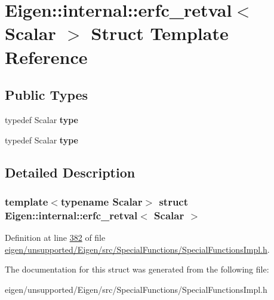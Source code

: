 \hypertarget{struct_eigen_1_1internal_1_1erfc__retval}{}\section{Eigen\+:\+:internal\+:\+:erfc\+\_\+retval$<$ Scalar $>$ Struct Template Reference}
\label{struct_eigen_1_1internal_1_1erfc__retval}
\subsection*{Public Types}
\begin{DoxyCompactItemize}
\item 
\mbox{\label{struct_eigen_1_1internal_1_1erfc__retval_a6b4c74ed95407afcec533882833e4356}} 
typedef Scalar {\bfseries type}
\item 
\mbox{\label{struct_eigen_1_1internal_1_1erfc__retval_a6b4c74ed95407afcec533882833e4356}} 
typedef Scalar {\bfseries type}
\end{DoxyCompactItemize}


\subsection{Detailed Description}
\subsubsection*{template$<$typename Scalar$>$\newline
struct Eigen\+::internal\+::erfc\+\_\+retval$<$ Scalar $>$}



Definition at line \hyperlink{eigen_2unsupported_2_eigen_2src_2_special_functions_2_special_functions_impl_8h_source_l00382}{382} of file \hyperlink{eigen_2unsupported_2_eigen_2src_2_special_functions_2_special_functions_impl_8h_source}{eigen/unsupported/\+Eigen/src/\+Special\+Functions/\+Special\+Functions\+Impl.\+h}.



The documentation for this struct was generated from the following file\+:\begin{DoxyCompactItemize}
\item 
eigen/unsupported/\+Eigen/src/\+Special\+Functions/\+Special\+Functions\+Impl.\+h\end{DoxyCompactItemize}
